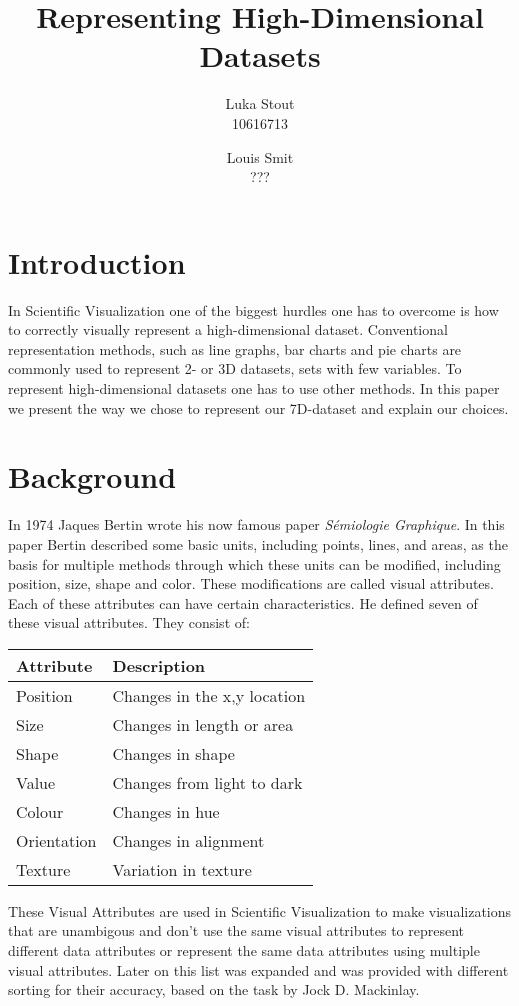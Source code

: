 \documentclass{article}
\title{Representing High-Dimensional Datasets}
\author{Luka Stout \\ 10616713  \and Louis Smit \\ ???}
\begin{document}
\maketitle

\section{Introduction}
In Scientific Visualization one of the biggest hurdles one has to overcome is how to correctly visually represent a high-dimensional dataset. Conventional representation methods, such as line graphs, bar charts and pie charts are commonly used to represent 2- or 3D 
datasets, sets with few variables. To represent high-dimensional datasets one has to use other methods. In this paper we present the way we chose to represent our 7D-dataset and explain our choices.

\section{Background}
In 1974 Jaques Bertin wrote his now famous paper \emph{Sémiologie Graphique}\cite{Bertin74}. In this paper Bertin described some basic units, including points, lines, and areas, as the basis for multiple methods through which these units can be modified, including position, size, shape and color. These modifications are called visual attributes. Each of these attributes can have certain characteristics. He defined seven of these visual attributes. They consist of:
\begin{center}
	\begin{tabular}{| l | l |}
	\hline
	\textbf{Attribute} & \textbf{Description} \\ \hline
	Position & Changes in the x,y location \\ \hline
	Size & Changes in length or area \\ \hline
	Shape & Changes in shape \\ \hline
	Value & Changes from light to dark \\ \hline
	Colour & Changes in hue \\ \hline
	Orientation & Changes in alignment \\ \hline
	Texture & Variation in texture \\ \hline
	\end{tabular}
\end{center}

These Visual Attributes are used in Scientific Visualization to make visualizations that are unambigous and don't use the same visual attributes to represent different data attributes or represent the same data attributes using multiple visual attributes. Later on this list was expanded and was provided with different sorting for their accuracy, based on the task by Jock D. Mackinlay\cite{Mackinlay86}.
\end{document}
